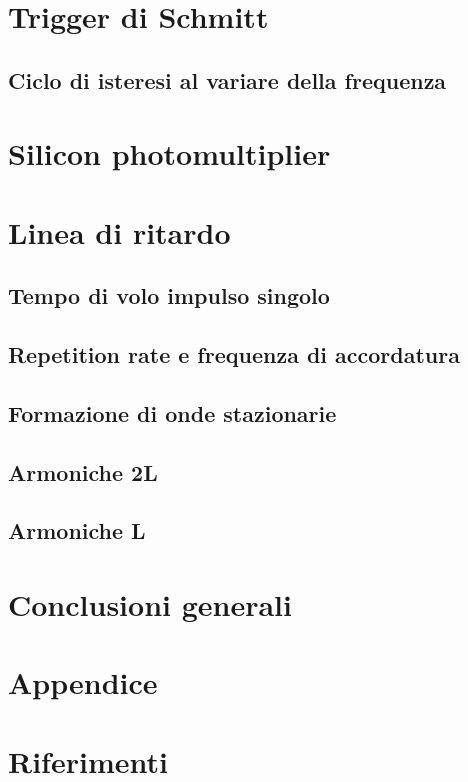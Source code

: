 \documentclass[journal]{IEEEtran}
\begin{document}
\section{Trigger di Schmitt}

\subsection{Ciclo di isteresi al variare della frequenza}


\section{Silicon photomultiplier} %


\section{Linea di ritardo} %

\subsection{Tempo di volo impulso singolo}

\subsection{Repetition rate e frequenza di accordatura}

\subsection{Formazione di onde stazionarie}

\subsection{Armoniche 2L}

\subsection{Armoniche L}

\section{Conclusioni generali}

\section{Appendice}

\section{Riferimenti}

\printbibliography
\end{document}
